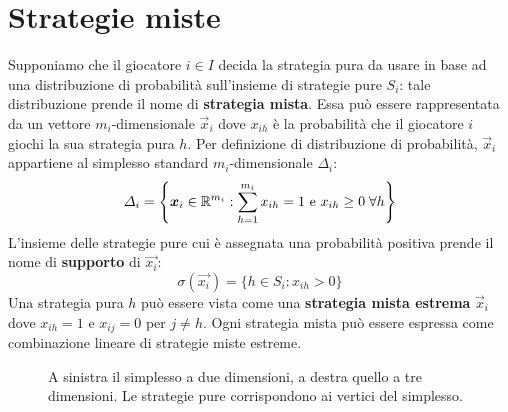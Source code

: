 \section{Strategie miste}

Supponiamo che il giocatore $i \in I$ decida la strategia pura da usare in base ad una distribuzione di probabilità sull'insieme di strategie pure $S_i$: tale distribuzione prende il nome di \textbf{strategia mista}. Essa può essere rappresentata da un vettore $m_i$-dimensionale $\vec{x}_i$ dove $x_{ih}$ è la probabilità che il giocatore $i$ giochi la sua strategia pura $h$. Per definizione di distribuzione di probabilità, $\vec{x}_i$ appartiene al simplesso standard $m_i$-dimensionale $\Delta_i$:
\begin{displaymath}
	\Delta_i = \left\{ \vec{x}_i \in \R^{m_i} : \sum_{h = 1}^{m_i} x_{ih} = 1 \text{ e } x_{ih} \geq 0 \; \forall h \right\}
\end{displaymath}
L'insieme delle strategie pure cui è assegnata una probabilità positiva prende il nome di \textbf{supporto} di $\vec{x_i}$:
\begin{displaymath}
	\sigma(\vec{x_i}) = \{h \in S_i : x_{ih} > 0 \}
\end{displaymath}
Una strategia pura $h$ può essere vista come una \textbf{strategia mista estrema} $\vec{x}_i$ dove $x_{ih} = 1$ e $x_{ij} = 0$ per $j \neq h$. Ogni strategia mista può essere espressa come combinazione lineare di strategie miste estreme.

\begin{figure}[h!]
	\centering
	\qquad\qquad
	\caption[Simplesso 2D e 3D]{A sinistra il simplesso a due dimensioni, a destra quello a tre dimensioni. Le strategie pure corrispondono ai vertici del simplesso.}
\end{figure}

